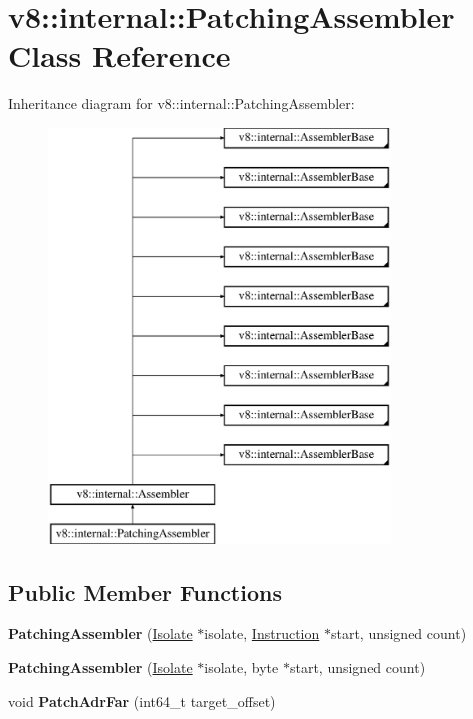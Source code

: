 \hypertarget{classv8_1_1internal_1_1_patching_assembler}{}\section{v8\+:\+:internal\+:\+:Patching\+Assembler Class Reference}
\label{classv8_1_1internal_1_1_patching_assembler}
Inheritance diagram for v8\+:\+:internal\+:\+:Patching\+Assembler\+:\begin{figure}[H]
\begin{center}
\leavevmode
\includegraphics[height=11.000000cm]{classv8_1_1internal_1_1_patching_assembler}
\end{center}
\end{figure}
\subsection*{Public Member Functions}
\begin{DoxyCompactItemize}
\item 
{\bfseries Patching\+Assembler} (\hyperlink{classv8_1_1internal_1_1_isolate}{Isolate} $\ast$isolate, \hyperlink{classv8_1_1internal_1_1_instruction}{Instruction} $\ast$start, unsigned count)\hypertarget{classv8_1_1internal_1_1_patching_assembler_ab50bdbd8753648ca321091bace07f1cc}{}\label{classv8_1_1internal_1_1_patching_assembler_ab50bdbd8753648ca321091bace07f1cc}

\item 
{\bfseries Patching\+Assembler} (\hyperlink{classv8_1_1internal_1_1_isolate}{Isolate} $\ast$isolate, byte $\ast$start, unsigned count)\hypertarget{classv8_1_1internal_1_1_patching_assembler_a3a626bfe686ad1c4334d649e0486eba1}{}\label{classv8_1_1internal_1_1_patching_assembler_a3a626bfe686ad1c4334d649e0486eba1}

\item 
void {\bfseries Patch\+Adr\+Far} (int64\+\_\+t target\+\_\+offset)\hypertarget{classv8_1_1internal_1_1_patching_assembler_a9bd484c283ffdb983741703bd58c1d5f}{}\label{classv8_1_1internal_1_1_patching_assembler_a9bd484c283ffdb983741703bd58c1d5f}

\end{DoxyCompactItemize}
